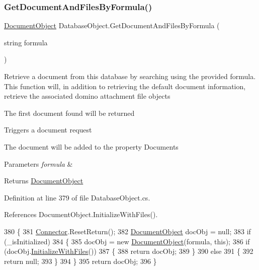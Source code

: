 \subsubsection{\texorpdfstring{Get\+Document\+And\+Files\+By\+Formula()}{GetDocumentAndFilesByFormula()}}
{\footnotesize\ttfamily \mbox{\hyperlink{class_document_object}{Document\+Object}} Database\+Object.\+Get\+Document\+And\+Files\+By\+Formula (\begin{DoxyParamCaption}\item[{string}]{formula }\end{DoxyParamCaption})}



Retrieve a document from this database by searching using the provided formula. This function will, in addition to retrieving the default document information, retrieve the associated domino attachment file objects 

The first document found will be returned

Triggers a document request

The document will be added to the property \textquotesingle{}Documents\textquotesingle{}


\begin{DoxyParams}{Parameters}
{\em formula} & \\
\hline
\end{DoxyParams}
\begin{DoxyReturn}{Returns}
\mbox{\hyperlink{class_document_object}{Document\+Object}}
\end{DoxyReturn}


Definition at line 379 of file Database\+Object.\+cs.



References Document\+Object.\+Initialize\+With\+Files().


\begin{DoxyCode}
380     \{
381         \mbox{\hyperlink{class_connector}{Connector}}.ResetReturn();
382         \mbox{\hyperlink{class_document_object}{DocumentObject}} docObj = null;
383         \textcolor{keywordflow}{if} (\_isInitialized)
384         \{
385             docObj = \textcolor{keyword}{new} \mbox{\hyperlink{class_document_object}{DocumentObject}}(formula, \textcolor{keyword}{this});
386             \textcolor{keywordflow}{if} (docObj.\mbox{\hyperlink{class_document_object_a83f0e855adc5fb7afd02d2e34767f5c8}{InitializeWithFiles}}())
387             \{
388                 \textcolor{keywordflow}{return} docObj;
389             \}
390             \textcolor{keywordflow}{else}
391             \{
392                 \textcolor{keywordflow}{return} null;
393             \}
394         \}
395         \textcolor{keywordflow}{return} docObj;
396     \}
\end{DoxyCode}
\mbox{\label{class_database_object_a30968034c65328e44ddb0fdac8ab1435}} 
